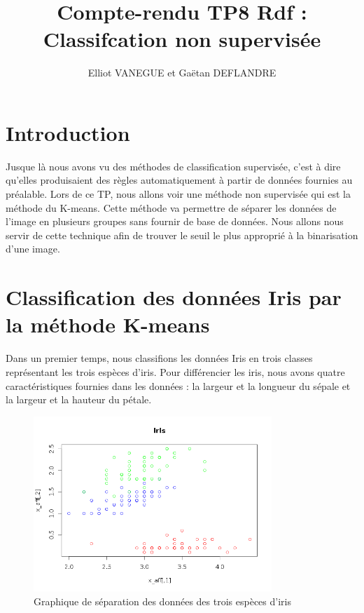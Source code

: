 \documentclass[a4paper,11pt]{article}
\title{Compte-rendu TP8 Rdf : Classifcation non supervisée}
\author{Elliot VANEGUE et Gaëtan DEFLANDRE}
\begin{document}
  
  
  
  \maketitle
  
  \mbox{}
  \newpage
  \clearpage
  
  \section*{Introduction}
  Jusque là nous avons vu des méthodes de classification supervisée, c'est à dire qu'elles produisaient
  des règles automatiquement à partir de données fournies au préalable. 
  Lors de ce TP, nous allons voir une méthode non supervisée qui est la méthode du K-means. Cette méthode
  va permettre de séparer les données de l'image en plusieurs groupes sans fournir de base de données. Nous allons
  nous servir de cette technique afin de trouver le seuil le plus approprié à la binarisation d'une image.
  
  \section{Classification des données Iris par la méthode K-means}
  Dans un premier temps, nous classifions les données Iris en trois classes représentant les trois espèces
  d'iris. Pour différencier les iris, nous avons quatre caractéristiques fournies dans les données : la largeur et
  la longueur du sépale et la largeur et la hauteur du pétale.\\
  
  \begin{figure}[H]
    \center
    \includegraphics[width=9cm]{resultat/separation_espece.png}
    \caption{Graphique de séparation des données des trois espèces d'iris}
  \end{figure}
  
\end{document}
